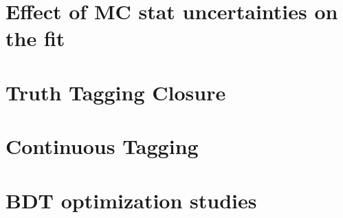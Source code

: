 \documentclass[UKenglish,texlive=2013]{\ATLASLATEXPATH atlasdoc}
\begin{document}
\clearpage
\section{Effect of MC stat uncertainties on the fit}
\label{app:statBias}


\clearpage
\section{Truth Tagging Closure}
\label{app:TRFClosure}


\clearpage
\section{Continuous Tagging}
\label{app:ContTag}

%

\clearpage

\section{BDT optimization studies}
\label{app:BDToptimization}


\clearpage
\end{document}
